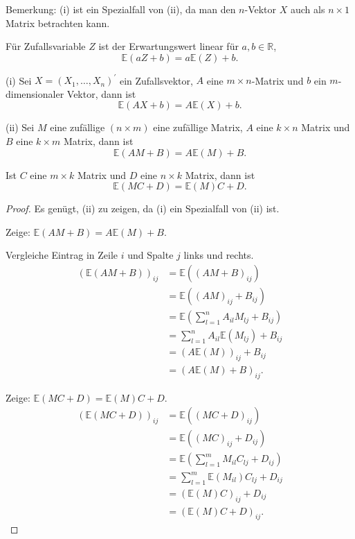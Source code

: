\documentclass{tstextbook}
\begin{document}
\begin{remark}
	Bemerkung: (i) ist ein Spezialfall von (ii), da man den $n$-Vektor
$X$ auch als $n\times1$ Matrix betrachten kann.
\end{remark}

Für Zufallsvariable $Z$ ist der Erwartungswert linear für $a,b\in\mathbb{R}$,
\[
\mathbb{E}(aZ+b)=a\mathbb{E}(Z)+b.
\]

\begin{theorem}
	\label{th:linearitäterwartungswert}
(i) Sei $X=(X_{1},\ldots,X_{n})^{\prime}$ ein Zufallsvektor, $A$
eine $m\times n$-Matrix und $b$ ein $m$-dimensionaler Vektor, dann
ist 
\[
\mathbb{E}(AX+b)=A\mathbb{E}(X)+b.
\]

(ii) Sei $M$ eine zufällige $(n\times m)$ eine zufällige Matrix,
$A$ eine $k\times n$ Matrix und $B$ eine $k\times m$ Matrix, dann
ist 
\[
\mathbb{E}(AM+B)=A\mathbb{E}(M)+B.
\]

Ist $C$ eine $m\times k$ Matrix und $D$ eine $n\times k$ Matrix,
dann ist 
\[
\mathbb{E}(MC+D)=\mathbb{E}(M)C+D.
\]

\end{theorem}

\begin{proof}
	

Es genügt, (ii) zu zeigen, da (i) ein Spezialfall von (ii) ist. 

Zeige: $\mathbb{E}(AM+B)=A\mathbb{E}(M)+B.$

Vergleiche Eintrag in Zeile $i$ und Spalte $j$ links und rechts.
\begin{align*}
	\left(\mathbb{E}(AM+B)\right)_{ij} & =\mathbb{E}\left((AM+B)_{ij}\right)\\
	& =\mathbb{E}\left((AM)_{ij}+B{}_{ij}\right)\\
	& =\mathbb{E}\left(\sum_{l=1}^{n}A_{il}M{}_{lj}+B{}_{ij}\right)\\
	& =\sum_{l=1}^{n}A_{il}\mathbb{E}\left(M_{lj}\right)+B_{ij}\\
	& =\left(A\mathbb{E}(M)\right)_{ij}+B_{ij}\\
	& =\left(A\mathbb{E}(M)+B\right)_{ij}.
\end{align*}

Zeige: $\mathbb{E}(MC+D)=\mathbb{E}(M)C+D$.
\begin{align*}
	\left(\mathbb{E}(MC+D)\right)_{ij} & =\mathbb{E}\left((MC+D)_{ij}\right)\\
	& =\mathbb{E}\left((MC)_{ij}+D{}_{ij}\right)\\
	& =\mathbb{E}\left(\sum_{l=1}^{m}M_{il}C{}_{lj}+D{}_{ij}\right)\\
	& =\sum_{l=1}^{m}\mathbb{E}\left(M_{il}\right)C_{lj}+D_{ij}\\
	& =\left(\mathbb{E}(M)C\right)_{ij}+D_{ij}\\
	& =\left(\mathbb{E}(M)C+D\right)_{ij}.
\end{align*}

\end{proof}
\end{document}
